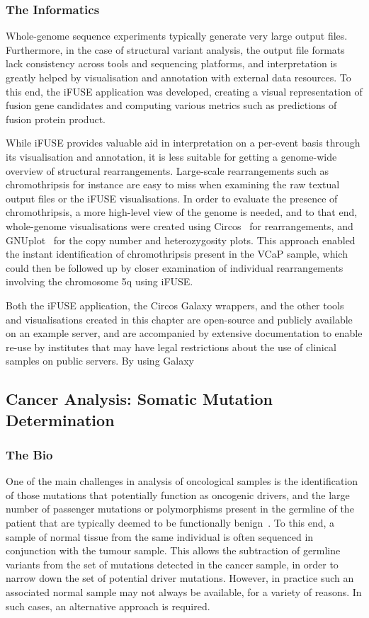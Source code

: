 \subsubsection{The Informatics}
Whole-genome sequence experiments typically generate very large output files. Furthermore, in the case of structural variant analysis, the output file formats lack consistency across tools and sequencing platforms, and interpretation is greatly helped by visualisation and annotation with external data resources. To this end, the iFUSE application was developed, creating a visual representation of fusion gene candidates and computing various metrics such as predictions of fusion protein product.

While iFUSE provides valuable aid in interpretation on a per-event basis through its visualisation and annotation, it is less suitable for getting a genome-wide overview of structural rearrangements. Large-scale rearrangements such as chromothripsis for instance are easy to miss when examining the raw textual output files or the iFUSE visualisations. In order to evaluate the presence of chromothripsis, a more high-level view of the genome is needed, and to that end, whole-genome visualisations were created using Circos~\cite{circos} for rearrangements, and GNUplot~\cite{url-gnuplot} for the copy number and heterozygosity plots. This approach enabled the instant identification of chromothripsis present in the VCaP sample, which could then be followed up by closer examination of individual rearrangements involving the chromosome 5q using iFUSE.

Both the iFUSE application, the Circos Galaxy wrappers, and the other tools and visualisations created in this chapter are open-source and publicly available on an example server, and are accompanied by extensive documentation to enable re-use by institutes that may have legal restrictions about the use of clinical samples on public servers. By using Galaxy


\subsection{Cancer Analysis: Somatic Mutation Determination}
\subsubsection{The Bio}
One of the main challenges in analysis of oncological samples is the identification of those mutations that potentially function as oncogenic drivers, and the large number of passenger mutations or polymorphisms present in the germline of the patient that are typically deemed to be functionally benign~\cite{lawrence2013mutational}. To this end, a sample of normal tissue from the same individual is often sequenced in conjunction with the tumour sample. This allows the subtraction of germline variants from the set of mutations detected in the cancer sample, in order to narrow down the set of potential driver mutations. However, in practice such an associated normal sample may not always be available, for a variety of reasons. In such cases, an alternative approach is required.


